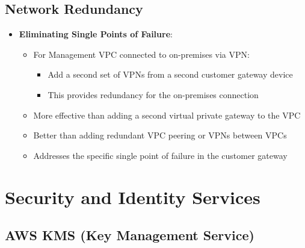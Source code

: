 \documentclass[11pt,a4paper]{report}
\begin{document}
\section{Network Redundancy}

\begin{itemize}
  \item \textbf{Eliminating Single Points of Failure}:
\begin{itemize}
  \item For Management VPC connected to on-premises via VPN:
\begin{itemize}
  \item Add a second set of VPNs from a second customer gateway device
  \item This provides redundancy for the on-premises connection
\end{itemize}
  \item More effective than adding a second virtual private gateway to the VPC
  \item Better than adding redundant VPC peering or VPNs between VPCs
  \item Addresses the specific single point of failure in the customer gateway
\end{itemize}
\end{itemize}



\chapter{Security and Identity Services}



\section{AWS KMS (Key Management Service)}
\end{document}
